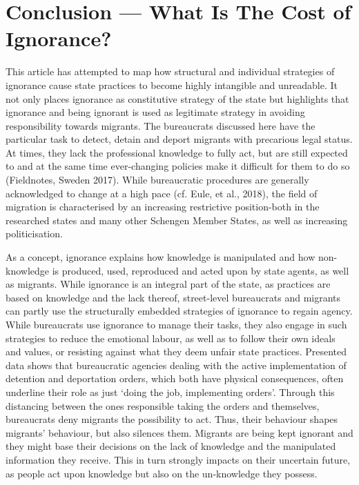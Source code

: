 \chapter{Conclusion --- What Is The Cost of Ignorance?}
This article has attempted to map how structural and individual strategies of ignorance cause state practices to become highly intangible and unreadable. It not only places ignorance as constitutive strategy of the state but highlights that ignorance and being ignorant is used as legitimate strategy in avoiding responsibility towards migrants. The bureaucrats discussed here have the particular task to detect, detain and deport migrants with precarious legal status. At times, they lack the professional knowledge to fully act, but are still expected to and at the same time ever-changing policies make it difficult for them to do so (Fieldnotes, Sweden 2017). While bureaucratic procedures are generally acknowledged to change at a high pace (cf. Eule, et al., 2018), the field of migration is characterised by an increasing restrictive position-both in the researched states and many other Schengen Member States, as well as  increasing politicisation.
\par
As a concept, ignorance explains how knowledge is manipulated and how non-knowledge is produced, used, reproduced and acted upon by state agents, as well as migrants. While ignorance is an integral part of the state, as practices are based on knowledge and the lack thereof, street-level bureaucrats and migrants can partly use the structurally embedded strategies of ignorance to regain agency. While bureaucrats use ignorance to manage their tasks, they also engage in such strategies to reduce the emotional labour, as well as to follow their own ideals and values, or resisting against what they deem unfair state practices. Presented data shows that bureaucratic agencies dealing with the active implementation of detention and deportation orders, which both have physical consequences, often underline their role as just ‘doing the job, implementing orders’. Through this distancing between the ones responsible taking the orders and themselves, bureaucrats deny migrants the possibility to act. Thus, their behaviour shapes migrants’ behaviour, but also silences them. Migrants are being kept ignorant and they might base their decisions on the lack of knowledge and the manipulated information they receive. This in turn strongly impacts on their uncertain future, as people act upon knowledge but also on the un-knowledge they possess.
\par
